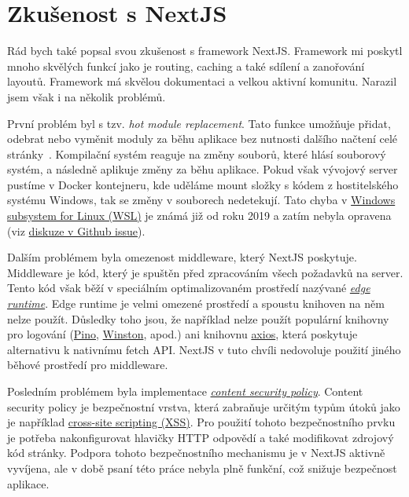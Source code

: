 \section{Zkušenost s NextJS}\label{sec:zkusenost-s-nextjs}

Rád bych také popsal svou zkušenost s framework NextJS\@.
Framework mi poskytl mnoho skvělých funkcí jako je routing, caching a také sdílení a zanořování layoutů.
Framework má skvělou dokumentaci a velkou aktivní komunitu.
Narazil jsem však i na několik problémů.

První problém byl s tzv. \textit{hot module replacement}.
Tato funkce umožňuje přidat, odebrat nebo vyměnit moduly za běhu aplikace bez nutnosti dalšího načtení celé stránky~\cite{hot-module-replacement-definition}.
Kompilační systém reaguje na změny souborů, které hlásí souborový systém, a následně aplikuje změny za běhu aplikace.
Pokud však vývojový server pustíme v Docker kontejneru, kde uděláme mount složky s kódem z hostitelského systému Windows, tak se změny v souborech nedetekují.
Tato chyba v \href{https://learn.microsoft.com/en-us/windows/wsl/about}{Windows subsystem for Linux (WSL)} je známá již od roku 2019 a zatím nebyla opravena (viz \href{https://github.com/microsoft/WSL/issues/4739}{diskuze v Github issue}).

Dalším problémem byla omezenost middleware, který NextJS poskytuje.
Middleware je kód, který je spuštěn před zpracováním všech požadavků na server.
Tento kód však běží v speciálním optimalizovaném prostředí nazývané \textit{\href{https://edge-runtime.vercel.app/}{edge runtime}}.
Edge runtime je velmi omezené prostředí a spoustu knihoven na něm nelze použít.
Důsledky toho jsou, že například nelze použít populární knihovny pro logování (\href{https://github.com/pinojs/pino}{Pino}, \href{https://github.com/winstonjs/winston}{Winston}, apod.) ani knihovnu \href{https://github.com/axios/axios}{axios}, která poskytuje alternativu k nativnímu fetch API\@.
NextJS v tuto chvíli nedovoluje použití jiného běhové prostředí pro middleware.

Posledním problémem byla implementace \textit{\href{https://developer.mozilla.org/en-US/docs/Web/HTTP/CSP}{content security policy}}.
Content security policy je bezpečnostní vrstva, která zabraňuje určitým typům útoků jako je například \href{https://developer.mozilla.org/en-US/docs/Glossary/Cross-site_scripting}{cross-site scripting (XSS)}.
Pro použití tohoto bezpečnostního prvku je potřeba nakonfigurovat hlavičky HTTP odpovědí a také modifikovat zdrojový kód stránky.
Podpora tohoto bezpečnostního mechanismu je v NextJS aktivně vyvíjena, ale v době psaní této práce nebyla plně funkční, což snižuje bezpečnost aplikace.


